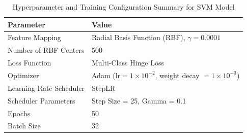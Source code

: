 \documentclass[conference]{IEEEtran}
\begin{document}
\begin{table}[h]
    \centering
    \caption{Hyperparameter and Training Configuration Summary for SVM Model}
    \begin{tabular}{@{}ll@{}}
    \toprule
    \textbf{Parameter} & \textbf{Value} \\
    \midrule
    Feature Mapping & Radial Basis Function (RBF), $\gamma = 0.0001$ \\
    Number of RBF Centers & 500 \\
    Loss Function & Multi-Class Hinge Loss \\
    Optimizer & Adam ($\text{lr} = 1 \times 10^{-2}$, weight decay $= 1 \times 10^{-3}$) \\
    Learning Rate Scheduler & StepLR \\
    Scheduler Parameters & Step Size = 25, Gamma = 0.1 \\
    Epochs & 50 \\
    Batch Size & 32 \\
    \bottomrule
    \end{tabular}
    \label{tab:svm_training_config}
\end{table}

\end{document}
